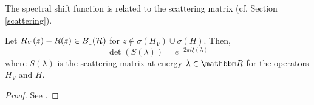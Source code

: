 The spectral shift function is related to the scattering matrix (cf. Section \ref{scattering}).

\begin{lemma}\label{ssf03t}
Let $R_V(z)-R(z)\in B_1({\mathcal H})$ for $z\notin\sigma(H_V)\cup\sigma(H)$. Then,
\begin{equation}\label{ssf03t01}
  \det(S(\lambda)) = e^{-2\pi i\xi(\lambda)}
\end{equation}
where $S(\lambda)$ is the scattering matrix at energy $\lambda\in\R$ for the operators $H_V$ and $H$.
\end{lemma}
\begin{proof}
See \cite[Thm. 0.9.4]{Yafaev2010}.
\end{proof}
